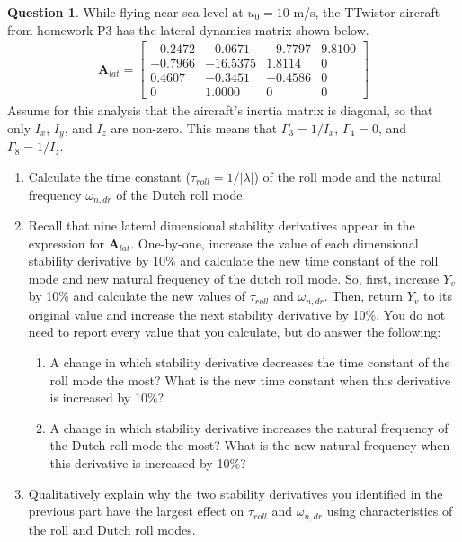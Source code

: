 \documentclass{article}
\theoremstyle{definition}
\newtheorem{question}{Question}
\begin{document}
\begin{question}
    While flying near sea-level at $u_0 = 10$ m/s, the TTwistor aircraft from homework P3 has the lateral dynamics matrix shown below.
    \begin{align*}
        \mathbf{A}_{lat} = 
        \begin{bmatrix}
         -0.2472 & -0.0671 & -9.7797 & 9.8100 \\
         -0.7966 & -16.5375 & 1.8114 & 0 \\
         0.4607 & -0.3451 & -0.4586 &  0 \\
         0 & 1.0000 & 0 & 0
        \end{bmatrix}
    \end{align*}
    Assume for this analysis that the aircraft's inertia matrix is diagonal, so that only $I_x$, $I_y$, and $I_z$ are non-zero. This means that $\Gamma_3 = 1/I_x$, $\Gamma_4 = 0$, and $\Gamma_8 = 1/I_z$.
    
    \begin{enumerate}
        \item Calculate the time constant ($\tau_{roll} = 1/|\lambda|$) of the roll mode and the natural frequency $\omega_{n,dr}$ of the Dutch roll mode.
        \item Recall that nine lateral dimensional stability derivatives appear in the expression for $\mathbf{A}_{lat}$. One-by-one, increase the value of each dimensional stability derivative by 10\% and calculate the new time constant of the roll mode and new natural frequency of the dutch roll mode. So, first, increase $Y_v$ by 10\% and calculate the new values of $\tau_{roll}$ and $\omega_{n,dr}$. Then, return $Y_v$ to its original value and increase the next stability derivative by 10\%. You do not need to report every value that you calculate, but do answer the following:
        \begin{enumerate}
            \item A change in which stability derivative decreases the time constant of the roll mode the most? What is the new time constant when this derivative is increased by 10\%?
            \item A change in which stability derivative increases the natural frequency of the Dutch roll mode the most? What is the new natural frequency when this derivative is increased by 10\%?
        \end{enumerate}
        \item Qualitatively explain why the two stability derivatives you identified in the previous part have the largest effect on $\tau_{roll}$ and $\omega_{n,dr}$ using characteristics of the roll and Dutch roll modes.
    \end{enumerate}
\end{question}
\vspace{0.1cm}
\end{document}
